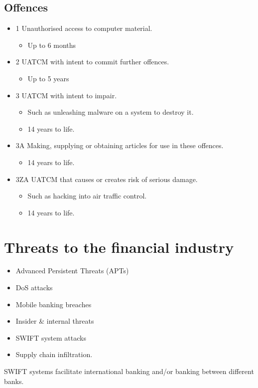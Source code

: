 \documentclass[12pt]{report}
\begin{document}
\subsection{Offences}
\begin{itemize}
	\item 1 Unauthorised access to computer material.
	\begin{itemize}
		\item Up to 6 months
	\end{itemize}
	\item 2 UATCM with intent to commit further offences.
	\begin{itemize}
		\item Up to 5 years
	\end{itemize}
	\item 3 UATCM with intent to impair.
	\begin{itemize}
		\item Such as unleashing malware on a system to destroy it.
		\item 14 years to life. 
	\end{itemize}
	\item 3A Making, supplying or obtaining articles for use in these offences.
	\begin{itemize}
		\item 14 years to life.
	\end{itemize}
	\item 3ZA UATCM that causes or creates risk of serious damage.
	\begin{itemize}
		\item Such as hacking into air traffic control.
		\item 14 years to life.
	\end{itemize}
\end{itemize}

\section{Threats to the financial industry}
\begin{multicols}{2}
	\begin{itemize}
		\item Advanced Persistent Threats (APTs)
		\item DoS attacks
		\item Mobile banking breaches
		\item Insider \& internal threats
		\item SWIFT system attacks
		\item Supply chain infiltration.
	\end{itemize}
\end{multicols}
\footnotesize\begin{center}
	SWIFT systems facilitate international banking and/or banking between different banks.
\end{center}\normalsize
\end{document}
